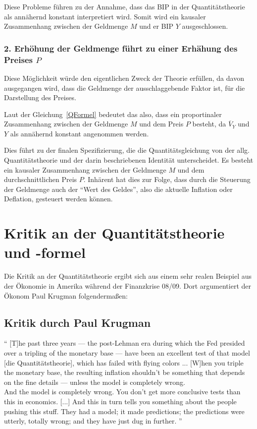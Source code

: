 Diese Probleme führen zu der Annahme, dass das BIP in der Quantitätstheorie als annähernd konstant interpretiert wird. Somit wird ein kausaler Zusammenhang zwischen der Geldmenge $M$ und er BIP $Y$ ausgeschlossen.

\subsubsection*{2. Erhöhung der Geldmenge führt zu einer Erhähung des Preises $P$}
Diese Möglichkeit würde den eigentlichen Zweck der Theorie erfüllen, da davon ausgegangen wird, dass die Geldmenge der ausschlaggebende Faktor ist, für die Darstellung des Preises.

Laut der Gleichung\, \vref*{QFormel} bedeutet das also, dass ein proportinaler Zusammenhang zwischen der Geldmenge $M$ und dem Preis $P$ besteht, da $\overline{V}_Y$ und $Y$ als annähernd konstant angenommen werden.

Dies führt zu der finalen Spezifizierung, die die Quantitätsgleichung von der allg. Quantitätstheorie und der darin beschriebenen Identität unterscheidet. Es besteht ein kausaler Zusammenhang zwischen der Geldmenge $M$ und dem durchschnittlichen Preis $P$.
Inhärent hat dies zur Folge, dass durch die Steuerung der Geldmenge auch der \enquote{Wert des Geldes}, also die aktuelle Inflation oder Deflation, gesteuert werden können.

\section{Kritik an der Quantitätstheorie und -formel}

Die Kritik an der Quantitätstheorie ergibt sich aus einem sehr realen Beispiel aus der Ökonomie in Amerika während der Finanzkrise 08/09. Dort argumentiert der Ökonom Paul Krugman folgendermaßen:

\subsection{Kritik durch Paul Krugman}

\enquote{
[T]he past three years — the post-Lehman era during which the Fed presided over a tripling of the monetary base — have been an excellent test of that model [die Quantitätstheorie], which has failed with flying colors ... [W]hen you triple the monetary base, the resulting inflation shouldn’t be something that depends on the fine details — unless the model is completely wrong.\\
And the model is completely wrong. You don’t get more conclusive tests than this in economics. [...] 
And this in turn tells you something about the people pushing this stuff. They had a model; it made predictions; the predictions were utterly, totally wrong; and they have just dug in further.
}\autocite{Krugman2011} 

